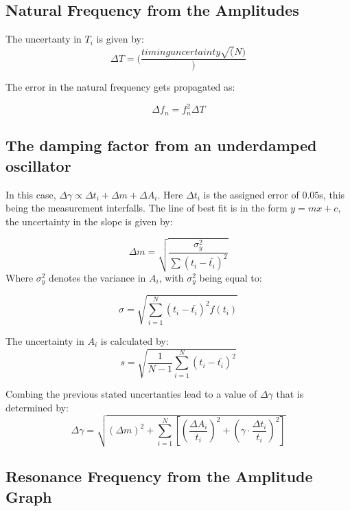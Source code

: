 \subsection{Natural Frequency from the Amplitudes} \label{appendix:errors:fn_amplitude}

The uncertanty in $T_i$ is given by:
\begin{equation}
  \Delta T = (\frac{timing uncertainty\sqrt(N )})
\end{equation}

The error in the natural frequency gets propagated as:

\begin{equation}
  \Delta f_n = f_n^2\Delta T 
\end{equation}

\subsection{The damping factor from an underdamped oscillator}
In this case, $\Delta \gamma \propto \Delta t_i +\Delta m + \Delta A_i$. Here $\Delta t_i$ is the assigned error of $0.05$s, this being the measurement interfalls. The line of best fit is in the form $y=mx+c$, the uncertainty in the slope is given by:

\begin{equation}
  \Delta m = \sqrt{\frac{\sigma_y^2}{\sum (t_i - \bar{t_i})^2}}
\end{equation}
Where $\sigma_y^2$ denotes the variance in $A_i$, with $\sigma_y^2$ being equal to:

\begin{equation}
\sigma = \sqrt{\sum_{i=1}^{N} {(t_i - \bar{t_i})^2}{f(t_i)}}
\end{equation}

The uncertainty in $A_i$ is calculated by:
\begin{equation}
  s = \sqrt{\frac{1}{N-1}\sum_{i = 1}^{N}(t_i - \bar{t_i})^2}
\end{equation}

Combing the previous stated uncertanties lead to a value of $\Delta \gamma$ that is determined by:
\begin{equation}
  \Delta \gamma = \sqrt{(\Delta m)^2 + \sum_{i=1}^{N} \left[ \left( \frac{\Delta A_i}{t_i} \right)^2 + \left( \gamma \cdot \frac{\Delta t_i}{t_i} \right)^2 \right]}
\end{equation}

\subsection{ Resonance Frequency from the Amplitude Graph } \label{appendix:errors:res_ampl}

